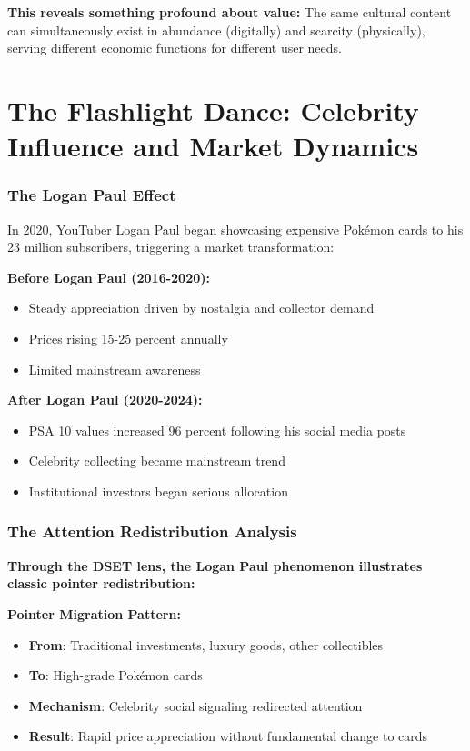 \documentclass[11pt,oneside]{book}
\begin{document}
\textbf{This reveals something profound about value:} The same cultural content can simultaneously exist in abundance (digitally) and scarcity (physically), serving different economic functions for different user needs.

\section{The Flashlight Dance: Celebrity Influence and Market Dynamics}

\subsubsection{The Logan Paul Effect}

In 2020, YouTuber Logan Paul began showcasing expensive Pokémon cards to his 23 million subscribers, triggering a market transformation:

\textbf{Before Logan Paul (2016-2020):}
\begin{itemize}
\item Steady appreciation driven by nostalgia and collector demand
\item Prices rising 15-25 percent annually
\item Limited mainstream awareness
\end{itemize}

\textbf{After Logan Paul (2020-2024):}
\begin{itemize}
\item PSA 10 values increased 96 percent following his social media posts
\item Celebrity collecting became mainstream trend
\item Institutional investors began serious allocation
\end{itemize}

\subsubsection{The Attention Redistribution Analysis}

\textbf{Through the DSET lens, the Logan Paul phenomenon illustrates classic pointer redistribution:}

\textbf{Pointer Migration Pattern:}
\begin{itemize}
\item \textbf{From}: Traditional investments, luxury goods, other collectibles
\item \textbf{To}: High-grade Pokémon cards
\item \textbf{Mechanism}: Celebrity social signaling redirected attention
\item \textbf{Result}: Rapid price appreciation without fundamental change to cards
\end{itemize}
\end{document}
